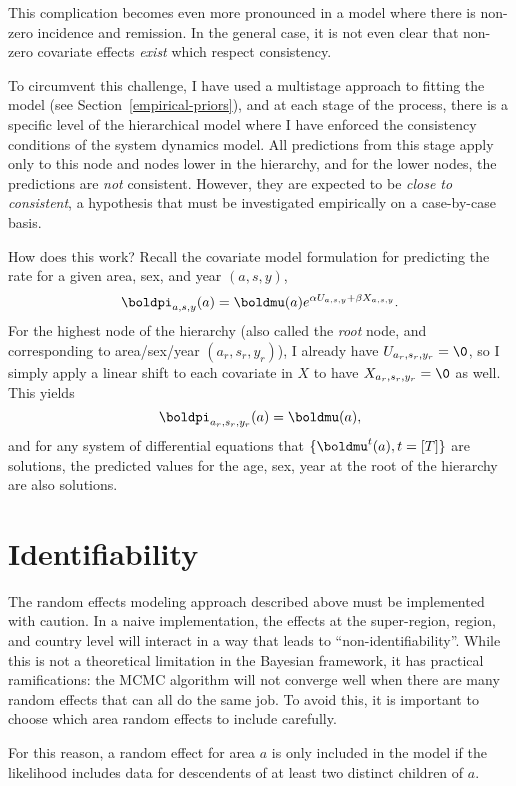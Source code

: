 This complication becomes even more pronounced in a model where there
is non-zero incidence and remission.  In the general case, it is not
even clear that non-zero covariate effects \emph{exist} which respect
consistency.

To circumvent this challenge, I have used a multistage approach to
fitting the model (see Section~\ref{empirical-priors}), and at each
stage of the process, there is a specific level of the hierarchical
model where I have enforced the consistency conditions of the system
dynamics model.  All predictions from this stage apply only to this
node and nodes lower in the hierarchy, and for the lower nodes, the
predictions are \emph{not} consistent.  However, they are expected to
be \emph{close to consistent}, a hypothesis that must be investigated
empirically on a case-by-case basis.

How does this work?  Recall the covariate model formulation for
predicting the rate for a given area, sex, and year $(a,s,y)$,
\[
\boldpi_{a,s,y}(a) = \boldmu(a)e^{\alpha U_{a,s,y} + \beta X_{a,s,y}}.
\]
For the highest node of the hierarchy (also called the \emph{root}
node, and corresponding to area/sex/year $(a_r, s_r, y_r)$), I already
have $U_{a_r,s_r,y_r} = \0$, so I simply apply a linear shift to each
covariate in $X$ to have $X_{{a_r},{s_r},{y_r}} = \0$ as well.  This
yields
\[
\boldpi_{a_r,s_r,y_r}(a) = \boldmu(a),
\]
and for any system of differential equations that $\{\boldmu^t(a),
t=[T]\}$ are solutions, the predicted values for the age, sex, year at
the root of the hierarchy are also solutions.


\section{Identifiability}
The random effects modeling approach described above must be
implemented with caution.  In a naive implementation, the effects at
the super-region, region, and country level will interact in a way
that leads to ``non-identifiability''.  While this is not a
theoretical limitation in the Bayesian framework, it has practical
ramifications:  the MCMC algorithm will not converge well when there
are many random effects that can all do the same job.  To avoid this,
it is important to choose which area random effects to include
carefully.

For this reason, a random effect for area $a$ is only included in the model if
the likelihood includes data for descendents of at least two distinct
children of $a$.

